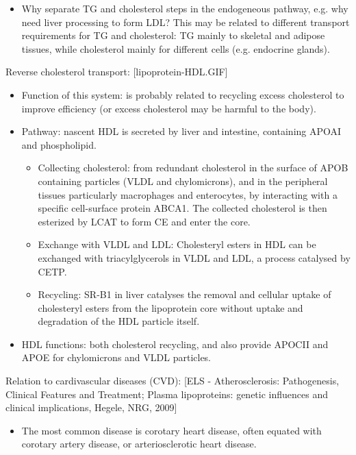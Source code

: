 \documentclass{report}
\begin{document}
\begin{enumerate}
\begin{itemize}
\item Why separate TG and cholesterol steps in the endogeneous pathway, e.g. why need liver processing to form LDL? This may be related to different transport requirements for TG and cholesterol: TG mainly to skeletal and adipose tissues, while cholesterol mainly for different cells (e.g. endocrine glands). 
\end{itemize}

Reverse cholesterol transport: [lipoprotein-HDL.GIF]
\begin{itemize}
\item Function of this system: is probably related to recycling excess cholesterol to improve efficiency (or excess cholesterol may be harmful to the body). 

\item Pathway: nascent HDL is secreted by liver and intestine, containing APOAI and phospholipid. 
\begin{itemize}
\item Collecting cholesterol: from redundant cholesterol in the surface of APOB containing particles (VLDL and chylomicrons), and in the peripheral tissues particularly macrophages and enterocytes, by interacting with a specific cell-surface protein ABCA1. The collected cholesterol is then esterized by LCAT to form CE and enter the core. 

\item Exchange with VLDL and LDL: Cholesteryl esters in HDL can be exchanged with triacylglycerols in VLDL and LDL, a process catalysed by CETP. 

\item Recycling: SR-B1 in liver catalyses the removal and cellular uptake of cholesteryl esters from the lipoprotein core without uptake and degradation of the HDL particle itself. 
\end{itemize}

\item HDL functions: both cholesterol recycling, and also provide APOCII and APOE for chylomicrons and VLDL particles. 
\end{itemize}

Relation to cardivascular diseases (CVD): [ELS - Atherosclerosis: Pathogenesis, Clinical Features and Treatment; Plasma lipoproteins: genetic influences and clinical implications, Hegele, NRG, 2009]
\begin{itemize}
\item The most common disease is corotary heart disease, often equated with corotary artery disease, or arteriosclerotic heart disease. 


\end{itemize}
\end{enumerate}
\end{document}
